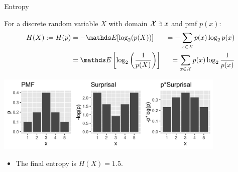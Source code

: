 \documentclass[11pt,compress,t,notes=noshow, xcolor=table]{beamer}
\begin{document}
\begin{vbframe}{Entropy}


For a discrete random variable $X$ with domain $\mathcal{X} \ni x$ and pmf $p(x)$:
\begin{equation*}
\begin{aligned} 
  H(X) := H(p) &= - \E[\log_2(p(X))]           &= -\sum_{x \in \Xspace} p(x) \log_2 p(x)\\ 
               &=   \E\left[\log_2\left(\frac{1}{p(X)}\right)\right] &= \sum_{x \in \Xspace} p(x) \log_2 \frac{1}{p(x)} 
\end{aligned} 
\end{equation*}

\begin{center}
\includegraphics[width = 11cm ]{figure/entropy_calc.png} 
\end{center}
\vspace{-0.5cm}
\begin{itemize}
\item The final entropy is $H(X)=1.5$.
\end{itemize}

  
\end{vbframe}
\end{document}
